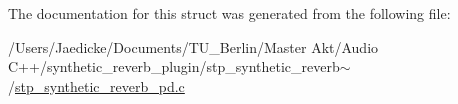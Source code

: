 The documentation for this struct was generated from the following file\+:\begin{DoxyCompactItemize}
\item 
/\+Users/\+Jaedicke/\+Documents/\+T\+U\+\_\+\+Berlin/\+Master Akt/\+Audio C++/synthetic\+\_\+reverb\+\_\+plugin/stp\+\_\+synthetic\+\_\+reverb$\sim$/\hyperlink{stp__synthetic__reverb__pd_8c}{stp\+\_\+synthetic\+\_\+reverb\+\_\+pd.\+c}\end{DoxyCompactItemize}

